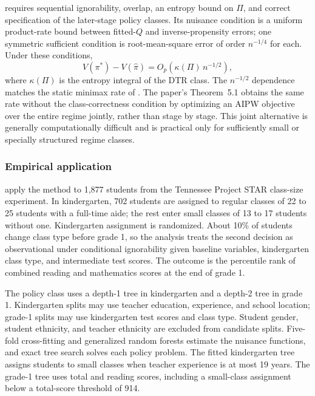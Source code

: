 \citet[Theorem~4.3]{sakaguchi2024dynamicpolicy} requires sequential ignorability, overlap, an entropy bound on $\Pi$, and correct specification of the later-stage policy classes. Its nuisance condition is a uniform product-rate bound between fitted-$Q$ and inverse-propensity errors; one symmetric sufficient condition is root-mean-square error of order $n^{-1/4}$ for each. Under these conditions,
\begin{equation}
V(\pi^*) - V(\hat\pi) = O_p\!\left(\kappa(\Pi)\, n^{-1/2}\right),
\label{eq:sakaguchi_regret}
\end{equation}
where $\kappa(\Pi)$ is the entropy integral of the DTR class. The $n^{-1/2}$ dependence matches the static minimax rate of \citet{kitagawa2018who}. The paper's Theorem~5.1 obtains the same rate without the class-correctness condition by optimizing an AIPW objective over the entire regime jointly, rather than stage by stage. This joint alternative is generally computationally difficult and is practical only for sufficiently small or specially structured regime classes.

\subsubsection*{Empirical application}

\citet{sakaguchi2024dynamicpolicy} apply the method to 1,877 students from the Tennessee Project STAR class-size experiment. In kindergarten, 702 students are assigned to regular classes of 22 to 25 students with a full-time aide; the rest enter small classes of 13 to 17 students without one. Kindergarten assignment is randomized. About 10\% of students change class type before grade 1, so the analysis treats the second decision as observational under conditional ignorability given baseline variables, kindergarten class type, and intermediate test scores. The outcome is the percentile rank of combined reading and mathematics scores at the end of grade 1.

The policy class uses a depth-1 tree in kindergarten and a depth-2 tree in grade 1. Kindergarten splits may use teacher education, experience, and school location; grade-1 splits may use kindergarten test scores and class type. Student gender, student ethnicity, and teacher ethnicity are excluded from candidate splits. Five-fold cross-fitting and generalized random forests estimate the nuisance functions, and exact tree search solves each policy problem. The fitted kindergarten tree assigns students to small classes when teacher experience is at most 19 years. The grade-1 tree uses total and reading scores, including a small-class assignment below a total-score threshold of 914.

